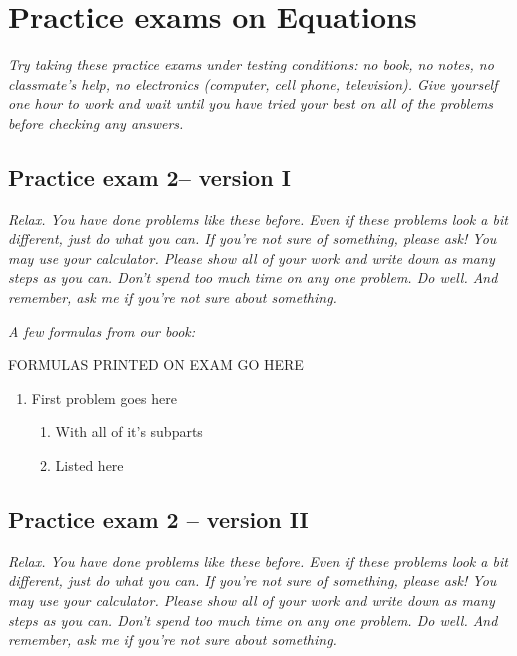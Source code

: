 
\section*{Practice exams on Equations}

\emph{Try taking these practice exams under testing conditions:  no book, no notes, no classmate's help, no electronics (computer, cell phone, television). Give yourself one hour to work and wait until you have tried your best on all of the problems before checking any answers.}
\bigskip

\subsection*{Practice exam 2-- version I}
\bigskip
 \emph{Relax.  You have done problems like these before.  Even if these problems look a bit different, just do what you can.  If you're not sure of something, please ask! You may use your calculator.  Please show all of your work and write down as many steps as you can.  Don't spend too much time on any one problem.  Do well.  And remember, ask me if you're not sure about something.}
 
\bigskip
 
\emph{A few formulas from our book:}

\begin{center}

FORMULAS PRINTED ON EXAM GO HERE

\end{center}

\hspace{-.25in} \hrulefill

\begin{enumerate}
\item First problem goes here
\begin{enumerate}
\item With all of it's subparts
\vfill
\item Listed here
\vfill
\end{enumerate}

\end{enumerate}

\newpage

\subsection*{Practice exam 2 -- version II}
\bigskip
 \emph{Relax.  You have done problems like these before.  Even if these problems look a bit different, just do what you can.  If you're not sure of something, please ask! You may use your calculator.  Please show all of your work and write down as many steps as you can.  Don't spend too much time on any one problem.  Do well.  And remember, ask me if you're not sure about something.}
 
